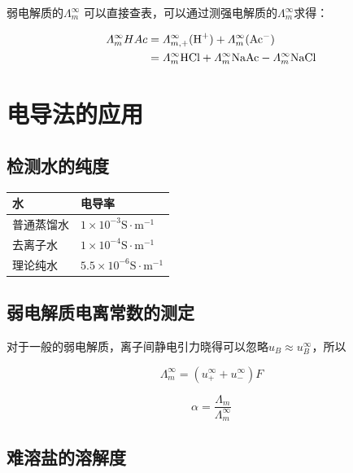 \documentclass[a4paper]{ctexrep}
\begin{document}
        弱电解质的$\varLambda_m^\infty$ 可以直接查表，可以通过测强电解质的$\varLambda_m^\infty$求得：

        \begin{align*}
            \varLambda_m^\infty{HAc} &= \varLambda_{m, +}^\infty(\ce{H+}) + \varLambda_m^\infty(\ce{Ac-}) \\
            &= \varLambda_m^\infty{\ce{HCl}} + \varLambda_m^\infty{\ce{NaAc}} - \varLambda_m^\infty{\ce{NaCl}}
        \end{align*}
    
    \section{电导法的应用}


    \subsection{检测水的纯度}

    \begin{table}[h]
        \centering
        \begin{tabular}{ll}
            \toprule
            \textbf{水} & \textbf{电导率} \\
            \midrule
            普通蒸馏水 & $ 1 \times 10^{-3} \mathrm{S \cdot m^{-1}} $ \\
            去离子水 & $ 1 \times 10^{-4} \mathrm{S \cdot m^{-1}} $ \\
            理论纯水 & $ 5.5 \times 10^{-6} \mathrm{S \cdot m^{-1}} $ \\
            \bottomrule
        \end{tabular}
    \end{table}

    \subsection{弱电解质电离常数的测定}
    对于一般的弱电解质，离子间静电引力晓得可以忽略$u_B \approx u_B^{\infty}$，所以

    \[
        \varLambda_m^{\infty} = (u_+^{\infty} + u_-^\infty)F 
    \]

    \[
        \alpha = \frac{\varLambda_m}{\varLambda_m^\infty}        
    \]


    \subsection{难溶盐的溶解度}
\end{document}

